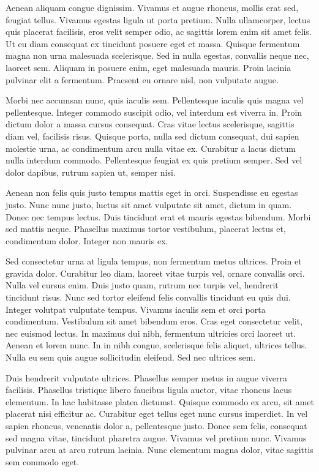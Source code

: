 \documentclass[
]{book}
\begin{document}
Aenean aliquam congue dignissim. Vivamus et augue rhoncus, mollis erat sed, feugiat tellus. Vivamus egestas ligula ut porta pretium. Nulla ullamcorper, lectus quis placerat facilisis, eros velit semper odio, ac sagittis lorem enim sit amet felis. Ut eu diam consequat ex tincidunt posuere eget et massa. Quisque fermentum magna non urna malesuada scelerisque. Sed in nulla egestas, convallis neque nec, laoreet sem. Aliquam in posuere enim, eget malesuada mauris. Proin lacinia pulvinar elit a fermentum. Praesent eu ornare nisl, non vulputate augue.

Morbi nec accumsan nunc, quis iaculis sem. Pellentesque iaculis quis magna vel pellentesque. Integer commodo suscipit odio, vel interdum est viverra in. Proin dictum dolor a massa cursus consequat. Cras vitae lectus scelerisque, sagittis diam vel, facilisis risus. Quisque porta, nulla sed dictum consequat, dui sapien molestie urna, ac condimentum arcu nulla vitae ex. Curabitur a lacus dictum nulla interdum commodo. Pellentesque feugiat ex quis pretium semper. Sed vel dolor dapibus, rutrum sapien ut, semper nisi.

Aenean non felis quis justo tempus mattis eget in orci. Suspendisse eu egestas justo. Nunc nunc justo, luctus sit amet vulputate sit amet, dictum in quam. Donec nec tempus lectus. Duis tincidunt erat et mauris egestas bibendum. Morbi sed mattis neque. Phasellus maximus tortor vestibulum, placerat lectus et, condimentum dolor. Integer non mauris ex.

Sed consectetur urna at ligula tempus, non fermentum metus ultrices. Proin et gravida dolor. Curabitur leo diam, laoreet vitae turpis vel, ornare convallis orci. Nulla vel cursus enim. Duis justo quam, rutrum nec turpis vel, hendrerit tincidunt risus. Nunc sed tortor eleifend felis convallis tincidunt eu quis dui. Integer volutpat vulputate tempus. Vivamus iaculis sem et orci porta condimentum. Vestibulum sit amet bibendum eros. Cras eget consectetur velit, nec euismod lectus. In maximus dui nibh, fermentum ultricies orci laoreet ut. Aenean et lorem nunc. In in nibh congue, scelerisque felis aliquet, ultrices tellus. Nulla eu sem quis augue sollicitudin eleifend. Sed nec ultrices sem.

Duis hendrerit vulputate ultrices. Phasellus semper metus in augue viverra facilisis. Phasellus tristique libero faucibus ligula auctor, vitae rhoncus lacus elementum. In hac habitasse platea dictumst. Quisque commodo ex arcu, sit amet placerat nisi efficitur ac. Curabitur eget tellus eget nunc cursus imperdiet. In vel sapien rhoncus, venenatis dolor a, pellentesque justo. Donec sem felis, consequat sed magna vitae, tincidunt pharetra augue. Vivamus vel pretium nunc. Vivamus pulvinar arcu at arcu rutrum lacinia. Nunc elementum magna dolor, vitae sagittis sem commodo eget.
\end{document}
